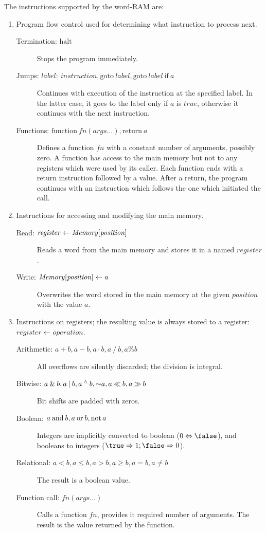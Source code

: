 The instructions supported by the word-RAM are:
\begin{enumerate}
	\item Program flow control used for determining what instruction to process next.
	\begin{description}
		\item[Termination: \textnormal{$\textrm{halt}$}]
		Stops the program immediately.
		\item[Jumps: \textnormal{$\mathit{label}{:}\ \mathit{instruction}, \textrm{goto}\ \mathit{label}, \textrm{goto}\ \mathit{label}\ \textrm{if}\ a$}]
		Continues with execution of the instruction at the specified label.
		In the latter case, it goes to the label only if $a$ is $\mathit{true}$, otherwise it continues with the next instruction.
		\item[Functions: \textnormal{$\textrm{function}\ \mathit{fn}(\mathit{args}\ldots), \textrm{return}\ a$}]
		Defines a function $\mathit{fn}$ with a constant number of arguments, possibly zero.
		A function has access to the main memory but not to any registers which were used by its caller.
		Each function ends with a return instruction followed by a value.
		After a return, the program continues with an instruction which follows the one which initiated the call.
	\end{description}
	\item Instructions for accessing and modifying the main memory.
	\begin{description}
		\item[Read: $\mathit{register} \gets \mathit{Memory}[\mathit{position}\char93$]
		Reads a word from the main memory and stores it in a named $\mathit{register}$.
		\item[Write: $\mathit{Memory}[\mathit{position}\char93 \gets a$]
		Overwrites the word stored in the main memory at the given $position$ with the value $a$.
	\end{description}
	\item Instructions on registers; the resulting value is always stored to a register: $\mathit{register} \gets \mathit{operation}$.
	\begin{description}
		\item[Arithmetic: $a + b, a - b, a \cdot b, a \mathbin{/} b, a \% b$]
		All overflows are silently discarded; the division is integral.
		\item[Bitwise: $a \mathbin{\&} b, a \mathbin{|} b, a \mathbin{^\wedge} b, \mathord{\sim} a, a \mathbin{\ll} b, a \mathbin{\gg} b$]
		Bit shifts are padded with zeros.
		\item[Boolean: \textnormal{$a \mathbin{\textrm{and}} b, a \mathbin{\textrm{or}} b, \mathord{\textrm{not}\,} a$}]
		Integers are implicitly converted to boolean ($0 \Leftrightarrow \false$), and booleans to integers ($\true \Rightarrow 1; \false \Rightarrow 0$).
		\item[Relational: $a < b, a \le b, a > b, a \ge b, a = b, a \ne b$]
		The result is a boolean value.
		\item[Function call: $\mathit{fn}(\mathit{args}\ldots)$]
		Calls a function $\mathit{fn}$, provides it required number of arguments.
		The result is the value returned by the function.
	\end{description}
\end{enumerate}
